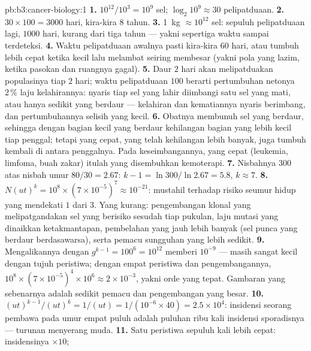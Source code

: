 \begin{solution}{pb:b3:cancer-biology:1}
\textbf{1.} $10^{12}/10^{3} = 10^{9}$ sel; $\log_{2}10^{9} \approx 30$
pelipatduaan.
\textbf{2.} $30\times 100 = 3000$ hari, kira-kira $8$ tahun.
\textbf{3.} \qty{1}{kg} $\approx 10^{12}$ sel: sepuluh pelipatduaan lagi,
$1000$ hari, kurang dari tiga tahun --- yakni sepertiga waktu sampai terdeteksi.
\textbf{4.} Waktu pelipatduaan awalnya pasti kira-kira $60$ hari, atau
 tumbuh lebih cepat ketika kecil lalu melambat seiring membesar (yakni
pola yang lazim, ketika pasokan dan ruangnya gagal).
\textbf{5.} Daur $2$ hari akan melipatduakan populasinya tiap $2$
hari; waktu pelipatduaan $100$ berarti pertumbuhan netonya $2\,\%$ laju
kelahirannya: nyaris tiap sel yang lahir diimbangi satu sel yang mati, atau
hanya sedikit yang berdaur --- kelahiran dan kematiannya nyaris berimbang, dan
pertumbuhannya selisih yang kecil.
\textbf{6.} Obatnya membunuh sel yang berdaur, sehingga  dengan bagian
kecil yang berdaur kehilangan bagian yang lebih kecil tiap penggal; tetapi
 yang cepat, yang telah kehilangan lebih banyak, juga tumbuh kembali di
antara penggalnya. Pada keseimbangannya,  yang cepat (leukemia, limfoma,
 buah zakar) itulah yang disembuhkan kemoterapi.
\textbf{7.} Nisbahnya $300$ atas nisbah umur $80/30 = 2.67$: $k - 1 =
\ln 300/\ln 2.67 = 5.8$, $k \approx 7$.
\textbf{8.} $N(ut)^{k} = 10^{8}\times (7\times 10^{-5})^{7} \approx
10^{-21}$: mustahil terhadap risiko seumur hidup yang mendekati $1$ dari $3$.
Yang kurang: pengembangan klonal yang melipatgandakan sel yang berisiko
sesudah tiap pukulan, laju mutasi yang dinaikkan ketakmantapan, pembelahan
yang jauh lebih banyak (sel punca yang berdaur berdasawarsa), serta pemacu
sungguhan yang lebih sedikit.
\textbf{9.} Mengalikannya dengan $g^{k-1} = 100^{6} = 10^{12}$ memberi $10^{-9}$
--- masih sangat kecil dengan tujuh peristiwa; dengan empat peristiwa dan
pengembangannya, $10^{8}\times (7\times 10^{-5})^{4}\times 10^{6} \approx 2\times
10^{-3}$, yakni orde yang tepat. Gambaran yang sebenarnya adalah sedikit
pemacu dan pengembangan yang besar.
\textbf{10.} $(ut)^{k-1}/(ut)^{k} = 1/(ut) = 1/(10^{-6}\times 40) =
2.5\times 10^{4}$: insidensi seorang pembawa pada umur empat puluh adalah
puluhan ribu kali insidensi sporadisnya ---  turunan menyerang muda.
\textbf{11.} Satu peristiwa sepuluh kali lebih cepat: insidensinya $\times 10$;

\end{solution}
